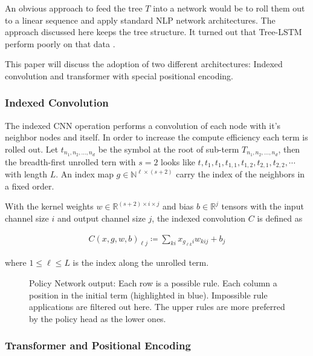 \documentclass{scrartcl}
\theoremstyle{definition}
\begin{document}
An obvious approach to feed the tree $T$ into a network would be to roll them out to a linear sequence and apply standard NLP network architectures. \cite{Lample2020Deep}
The approach discussed here keeps the tree structure. It turned out that Tree-LSTM perform poorly on that data \cite{tai2015improved}.

This paper will discuss the adoption of two different architectures: Indexed convolution and transformer with special positional encoding.

\subsubsection{Indexed Convolution}

The indexed CNN operation performs a convolution of each node with it's neighbor nodes and itself.
In order to increase the compute efficiency each term is rolled out.
Let $t_{n_1, n_2, \dots, n_d}$ be the symbol at the root of sub-term $T_{n_1, n_2, \dots, n_d}$,
then the breadth-first unrolled tern with $s=2$ looks like $t, t_1, t_1, t_{1,1},t_{1,2}, t_{2,1}, t_{2,2}, \cdots$ with length $L$.
An index map $g \in \mathbb{N}^{\ell\times \left( s+2 \right)}$ carry the index of the neighbors in a fixed order.

With the kernel weights $w \in \mathbb{R}^{\left( s+2 \right)\times i \times j}$ and bias $b \in \mathbb{R}^j$ tensors with the input channel size $i$ and output channel size $j$,
the indexed convolution $C$ is defined as

\begin{align}
	C\left( x, g, w, b \right)_{\ell j} \coloneqq \sum_{ki}x_{g_{\ell k}i} w_{kij}+b_j
\end{align}

where $1 \leq \ell \leq L$ is the index along the unrolled term.


\begin{figure}[!htbp]
	\centering
	
	\caption{Policy Network output: Each row is a possible rule. Each column a position in the initial term (highlighted in blue).
	Impossible rule applications are filtered out here.
	The upper rules are more preferred by the policy head as the lower ones.}
\end{figure}

\subsubsection{Transformer and Positional Encoding}
\end{document}
